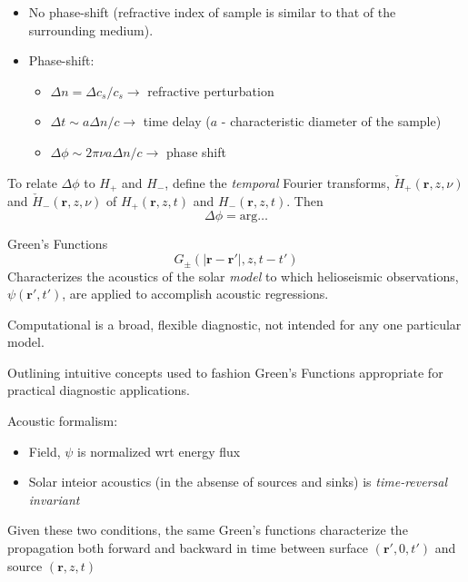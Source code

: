 \documentclass{beamer}
\begin{document}
\begin{frame}
    \begin{itemize}
        \item No phase-shift (refractive index of sample is similar to
            that of the surrounding medium).
        \item Phase-shift:
            \begin{itemize}
                \item $\Delta{n} = \Delta{c_{s}}/c_{s} \rightarrow$
                    refractive perturbation
                \item $\Delta{t} \sim a\Delta{n}/c \rightarrow$
                    time delay ($a$ - characteristic diameter of the sample)
                \item $\Delta{\phi} \sim 2\pi\nu a\Delta{n}/c \rightarrow$
                    phase shift
            \end{itemize}
    \end{itemize}
\end{frame}

\begin{frame}
    To relate $\Delta\phi$ to $H_{+}$ and $H_{-}$, define the
    \emph{temporal} Fourier transforms,
    $ \check{H}_{+}(\mathbf{r},z,\nu)  $
    and
    $ \check{H}_{-}(\mathbf{r},z,\nu)  $
    of
    $ {H}_{+}(\mathbf{r},z,t)  $
    and
    $ {H}_{-}(\mathbf{r},z,t)$.
    Then
    $$ \Delta\phi = \textrm{arg}\ldots $$
\end{frame}

\begin{frame}{Green's Functions}
    $$ G_{\pm}(|\mathbf{r}-\mathbf{r}'|,z,t-t') $$
    Characterizes the acoustics of the solar \emph{model}
    to which helioseismic observations,
    $\psi(\mathbf{r}',t')$,
    are applied to accomplish acoustic regressions.

    Computational is a broad, flexible diagnostic,
    not intended for any one particular model.

    Outlining intuitive concepts used to fashion Green's Functions
    appropriate for practical diagnostic applications.
\end{frame}

\begin{frame}{8.2}
    Acoustic formalism:
    \begin{itemize}
        \item Field, $\psi$ is normalized wrt energy flux
        \item Solar inteior acoustics (in the absense of sources
            and sinks) is \emph{time-reversal invariant}
    \end{itemize}
    Given these two conditions, the same Green's functions characterize
    the propagation both forward and backward in time between surface
    $(\mathbf{r}',0,t')$ and source $(\mathbf{r},z,t)$
\end{frame}
\end{document}

